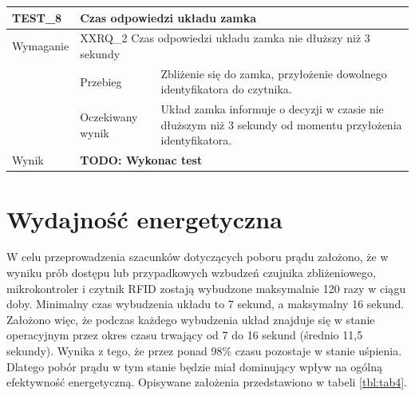 \begin{table}[h!]
\begin{subtable}[c]{\textwidth}
                \vspace{10mm}
            \end{subtable}
        \quad%
            \begin{subtable}[c]{\textwidth}
                \centering
                    \begin{tabular}{|p{2cm}|p{}|p{}|}
                    \hline
                    TEST\_8               & \multicolumn{2}{l|}{\textbf{Czas odpowiedzi układu zamka}}                                                            \\ \hline
                    \cellcolor[gray]{0.8} Wymaganie             & \multicolumn{2}{p{12cm}|}{XXRQ\_2 Czas odpowiedzi układu zamka nie dłuższy niż 3 sekundy }                                                                                    \\ \hline
                    \cellcolor[gray]{0.8} \multirow{2}{*}{Opis} & Przebieg           & Zbliżenie się do zamka, przyłożenie dowolnego identyfikatora do czytnika.  \\ \cline{2-3}
                    \cellcolor[gray]{0.8}                      & Oczekiwany wynik   & Układ zamka informuje o decyzji w czasie nie dłuższym niż 3 sekundy od momentu przyłożenia identyfikatora.                                                  \\ \hline
                    \cellcolor[gray]{0.8} Wynik                 & \multicolumn{2}{p{12cm}|}{\textbf{TODO: Wykonac test}}                                                                                  \\ \hline
                    \end{tabular}%
                \label{tbl:test6}
                \vspace{10mm}
            \end{subtable}
            \label{tbl:tests}
        \end{table}

    \pagebreak

    \section{Wydajność energetyczna}

        W celu przeprowadzenia szacunków dotyczących poboru prądu założono, że w wyniku prób dostępu lub przypadkowych wzbudzeń czujnika zbliżeniowego, mikrokontroler i czytnik RFID zostają wybudzone maksymalnie 120 razy w ciągu doby. Minimalny czas wybudzenia układu to 7 sekund, a maksymalny 16 sekund. Założono więc, że podczas każdego wybudzenia układ znajduje się w stanie operacyjnym przez okres czasu trwający od 7 do 16 sekund (średnio 11,5 sekundy). Wynika z tego, że przez ponad 98\% czasu pozostaje w stanie uśpienia. Dlatego pobór prądu w tym stanie będzie miał dominujący wpływ na ogólną efektywność energetyczną. Opisywane założenia przedstawiono w tabeli \ref{tbl:tab4}.

